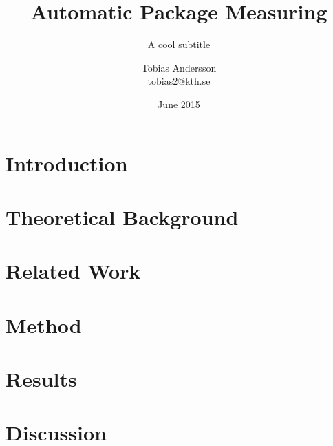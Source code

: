 \documentclass[a4paper,11pt]{kth-mag}
\title{Automatic Package Measuring}
\subtitle{A cool subtitle}
\author{Tobias Andersson\\\MakeLowercase{tobias2@kth.se}}
\date{June 2015}
\begin{document}
\frontmatter
\pagestyle{empty}
\removepagenumbers
\maketitle
{}




\clearpage



\clearpage
\tableofcontents*
\mainmatter


\pagestyle{newchap}

\chapter{Introduction}


\chapter{Theoretical Background}


\chapter{Related Work}


\chapter{Method}


\chapter{Results}


\chapter{Discussion}

\end{document}
